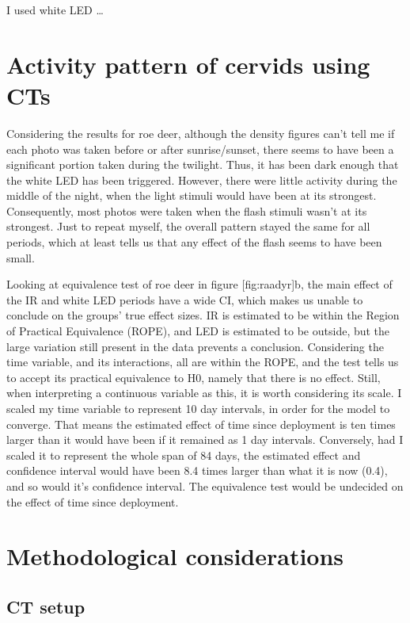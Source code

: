 I used white LED …


\section{Activity pattern of cervids using CTs}

Considering the results for roe deer, although the density figures can’t tell me if each photo was taken before or after sunrise/sunset, there seems to have been a significant portion taken during the twilight. 
Thus, it has been dark enough that the white LED has been triggered.
However, there were little activity during the middle of the night, when the light stimuli would have been at its strongest. 
Consequently, most photos were taken when the flash stimuli wasn’t at its strongest. 
Just to repeat myself, the overall pattern stayed the same for all periods, which at least tells us that any effect of the flash seems to have been small.

Looking at equivalence test of roe deer in figure [fig:raadyr]b, the main effect of the IR and white LED periods have a wide CI, which makes us unable to conclude on the groups’ true effect sizes. IR is estimated to be within the Region of Practical Equivalence (ROPE), and LED is estimated to be outside, but the large variation still present in the data prevents a conclusion.
Considering the time variable, and its interactions, all are within the ROPE, and the test tells us to accept its practical equivalence to H0, namely that there is no effect. Still, when interpreting a continuous variable as this, it is worth considering its scale. I scaled my time variable to represent 10 day intervals, in order for the model to converge. That means the estimated effect of time since deployment is ten times larger than it would have been if it remained as 1 day intervals. Conversely, had I scaled it to represent the whole span of 84 days, the estimated effect and confidence interval would have been 8.4 times larger than what it is now (0.4), and so would it’s confidence interval. The equivalence test would be undecided on the effect of time since deployment.


\section{Methodological considerations}

\subsection{CT setup}

